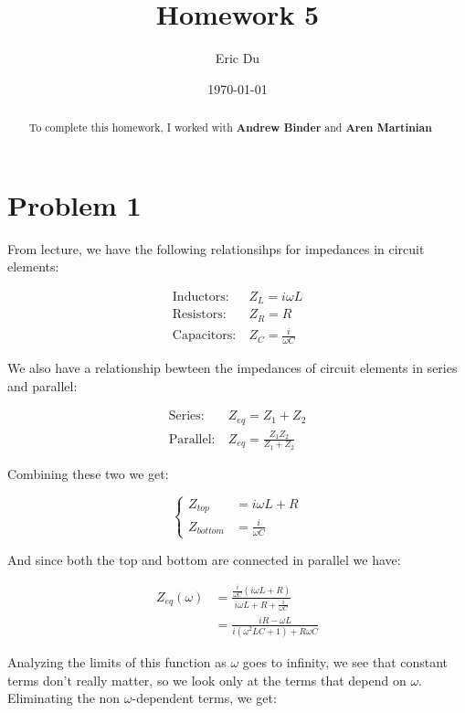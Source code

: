 \documentclass{article}
\title{Homework 5}
\author{Eric Du}
\date{\today}
\theoremstyle{definition}
\numberwithin{equation}{section}
\numberwithin{definition}{section}
\begin{document}
\maketitle

\begin{abstract}
\noindent To complete this homework, I worked with \textbf{Andrew Binder} and \textbf{Aren Martinian}
\end{abstract}

\section{Problem 1}

From lecture, we have the following relationsihps for impedances in circuit elements: 

\begin{align*}
\text{Inductors:}& \ Z_L = i\omega L\\
\text{Resistors:}& \ Z_R = R\\
\text{Capacitors:}& \ Z_C = \frac{i}{\omega C}
\end{align*}

We also have a relationship bewteen the impedances of circuit elements in series and parallel:

\begin{align*}
\text{Series:}& \ Z_{eq} = Z_1 + Z_2\\
\text{Parallel:}& \ Z_{eq} = \frac{Z_1Z_2}{Z_1 + Z_2} 
\end{align*}

Combining these two we get:

\[\begin{cases}
Z_{top} &= i\omega L + R \\
Z_{bottom} &= \frac{i}{\omega C}
\end{cases}\]

And since both the top and bottom are connected in parallel we have: 

\begin{align*}
    Z_{eq}(\omega) &= \frac{\frac{i}{\omega C}(i\omega L + R)}{i\omega L + R + \frac{i}{\omega C}}\\
    &= \frac{iR - \omega L}{i(\omega^2 LC + 1) + R\omega C}
\end{align*}

Analyzing the limits of this function as $\omega$ goes to infinity, we see that constant terms don't really matter, so we look only at the terms that depend on $\omega$. Eliminating the non $\omega$-dependent terms, we get: 
\end{document}
